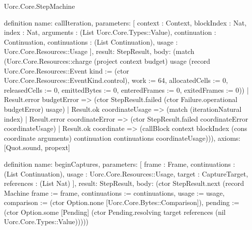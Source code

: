 \begin{lexlean}{Uorc.Core.StepMachine}
\begin{semanticmodule}
definition{
  name: callIteration,
  parameters: [
    context : Context,
    blockIndex : Nat,
    index : Nat,
    arguments : (List Uorc.Core.Types::Value),
    continuation : Continuation,
    continuations : (List Continuation),
    usage : Uorc.Core.Resources::Usage
  ],
  result: StepResult,
  body: (match (Uorc.Core.Resources::charge (project context budget) usage (record Uorc.Core.Resources::Event {kind := (ctor Uorc.Core.Resources::EventKind.control), work := 64, allocatedCells := 0, releasedCells := 0, emittedBytes := 0, enteredFrames := 0, exitedFrames := 0}))
    | Result.error budgetError => (ctor StepResult.failed (ctor Failure.operational budgetError) usage)
    | Result.ok coordinateUsage => (match (iterationNatural index)
      | Result.error coordinateError => (ctor StepResult.failed coordinateError coordinateUsage)
      | Result.ok coordinate => (callBlock context blockIndex (cons coordinate arguments) continuation continuations coordinateUsage))),
  axioms: [Quot.sound, propext]
}

definition{
  name: beginCaptures,
  parameters: [
    frame : Frame,
    continuations : (List Continuation),
    usage : Uorc.Core.Resources::Usage,
    target : CaptureTarget,
    references : (List Nat)
  ],
  result: StepResult,
  body: (ctor StepResult.next (record Machine {frame := frame, continuations := continuations, usage := usage, comparison := (ctor Option.none [Uorc.Core.Bytes::Comparison]), pending := (ctor Option.some [Pending] (ctor Pending.resolving target references (nil Uorc.Core.Types::Value)))}))
}


\end{semanticmodule}
\end{lexlean}
